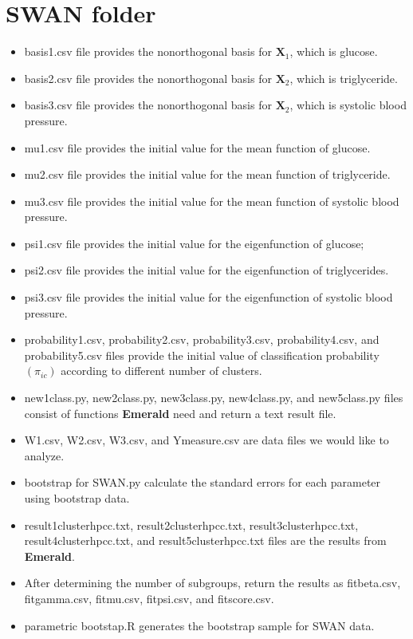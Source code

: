 \documentclass[useAMS,usenatbib,referee]{article}
\newcommand{\BX}{{\pmb X}}
\begin{document}
\section{SWAN folder}
\begin{itemize}
    \item basis1.csv file provides the nonorthogonal basis for $\BX_1$, which is glucose.
    \item  basis2.csv file provides the nonorthogonal basis for $\BX_2$, which is triglyceride.
    \item   basis3.csv file provides the nonorthogonal basis for $\BX_2$, which is systolic blood pressure.
    \item mu1.csv file provides the initial value for the mean function of glucose.
     \item mu2.csv file provides the initial value for the mean function of triglyceride.
      \item mu3.csv file provides the initial value for the mean function of systolic blood pressure.
      \item psi1.csv file provides the initial value for the eigenfunction of glucose;
      \item psi2.csv file provides the initial value for the eigenfunction of triglycerides.
      \item psi3.csv file provides the initial value for the eigenfunction of systolic blood pressure.
      \item probability1.csv, probability2.csv, probability3.csv, probability4.csv, and probability5.csv files provide the initial value of classification probability $(\pi_{ic})$ according to different number of clusters.
      \item new1class.py, new2class.py, new3class.py, new4class.py, and new5class.py files consist of functions \textbf{Emerald} need and return a text result file.
      \item W1.csv, W2.csv, W3.csv, and Ymeasure.csv are data files we would like to analyze.
      \item bootstrap for SWAN.py calculate the standard errors for each parameter using bootstrap data.
     \item result\textunderscore 1cluster\textunderscore hpcc.txt, result\textunderscore 2cluster\textunderscore hpcc.txt, result\textunderscore 3cluster\textunderscore hpcc.txt, result\textunderscore 4cluster\textunderscore hpcc.txt, and result\textunderscore 5cluster\textunderscore hpcc.txt files are the results from \textbf{Emerald}.
     \item After determining the number of subgroups, return the results as fit\textunderscore beta.csv, fit\textunderscore gamma.csv, fit\textunderscore mu.csv, fit\textunderscore psi.csv, and fit\textunderscore score.csv.
     \item parametric bootstap.R generates the bootstrap sample for SWAN data.
\end{itemize}
\end{document}
